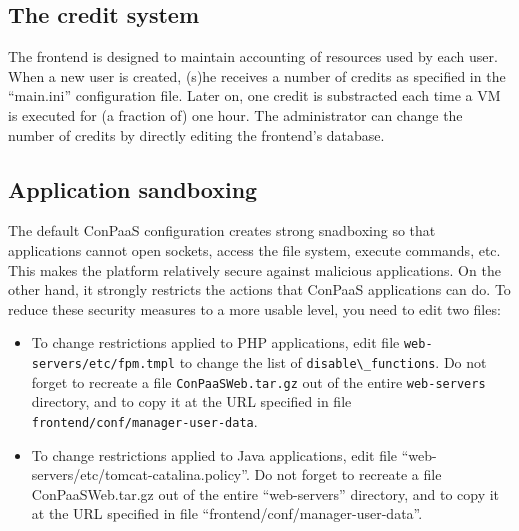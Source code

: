 \documentclass[10pt]{article}
\begin{document}
\subsection{The credit system}

The frontend is designed to maintain accounting of resources used by
each user. When a new user is created, (s)he receives a number of
credits as specified in the ``main.ini'' configuration file. Later on,
one credit is substracted each time a VM is executed for (a fraction
of) one hour. The administrator can change the number of credits by
directly editing the frontend's database. 

\subsection{Application sandboxing}

The default ConPaaS configuration creates strong snadboxing so that
applications cannot open sockets, access the file system, execute
commands, etc. This makes the platform relatively secure against
malicious applications. On the other hand, it strongly restricts the
actions that ConPaaS applications can do. To reduce these security
measures to a more usable level, you need to edit two files:

\begin{itemize}
\item To change restrictions applied to PHP applications, edit file
  \verb+web-servers/etc/fpm.tmpl+ to change the list of
  \verb+disable\_functions+. Do not forget to recreate a file
  \verb+ConPaaSWeb.tar.gz+ out of the entire \verb+web-servers+
  directory, and to copy it at the URL specified in file
  \verb+frontend/conf/manager-user-data+.
\item To change restrictions applied to Java applications, edit file
  ``web-servers/etc/tomcat-catalina.policy''. Do not forget to
  recreate a file ConPaaSWeb.tar.gz out of the entire ``web-servers''
  directory, and to copy it at the URL specified in file
  ``frontend/conf/manager-user-data''.
\end{itemize}
\end{document}
